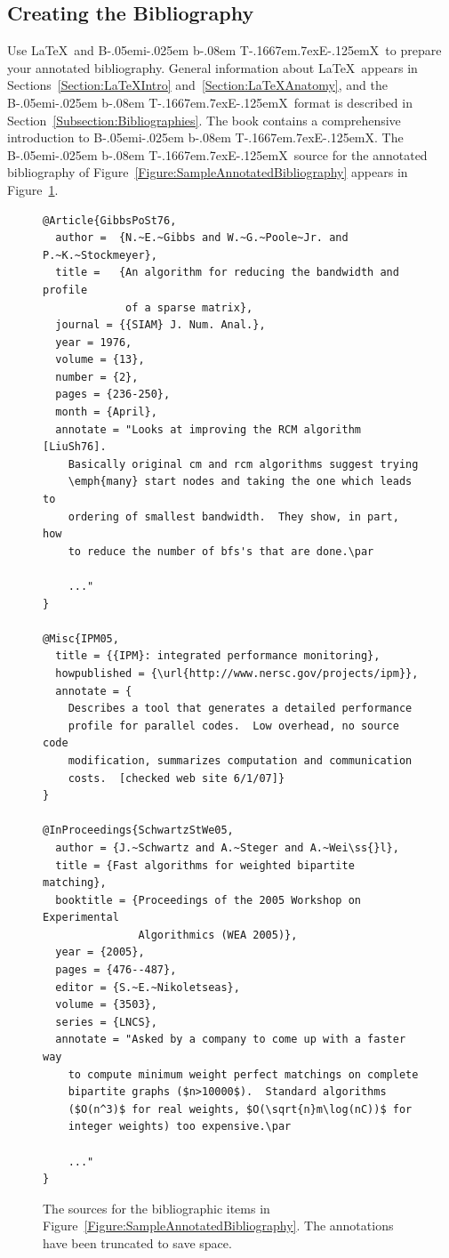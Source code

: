 \documentclass[finalcopy]{srpaper}
\def\hyperref[#1]{}
\let\plainref\ref
\newcommand{\plainref}{\ref*}
\newcommand{\namedref}[2]{\hyperref[#2]{#1~\plainref{#2}}}
\def\BibTeX{{\rm B\kern-.05em{\sc i\kern-.025em b}\kern-.08em
    T\kern-.1667em\lower.7ex\hbox{E}\kern-.125emX}}
\begin{document}
\subsection{Creating the Bibliography}
Use \LaTeX\ and \BibTeX\ to prepare your annotated
bibliography. General information about \LaTeX\ appears in
\namedref{Sections}{Section:LaTeXIntro}
and~\ref{Section:LaTeXAnatomy}, and the \BibTeX\ format
is described in \namedref{Section}{Subsection:Bibliographies}.
The book \cite{Lamport1994} contains a comprehensive
introduction to \BibTeX.
The \BibTeX\ source for the annotated bibliography of
\namedref{Figure}{Figure:SampleAnnotatedBibliography} appears in
\namedref{Figure}{Figure:SampleAnnotatedEntries}.
\begin{figure}
\begin{center}
\begin{minipage}{0.9\textwidth}\fontsize{9}{10}
\begin{verbatim}
@Article{GibbsPoSt76,
  author =  {N.~E.~Gibbs and W.~G.~Poole~Jr. and P.~K.~Stockmeyer},
  title =   {An algorithm for reducing the bandwidth and profile
             of a sparse matrix},
  journal = {{SIAM} J. Num. Anal.},
  year = 1976,
  volume = {13},
  number = {2},
  pages = {236-250},
  month = {April},
  annotate = "Looks at improving the RCM algorithm [LiuSh76].
    Basically original cm and rcm algorithms suggest trying
    \emph{many} start nodes and taking the one which leads to
    ordering of smallest bandwidth.  They show, in part, how
    to reduce the number of bfs's that are done.\par

    ..."
}

@Misc{IPM05,
  title = {{IPM}: integrated performance monitoring},
  howpublished = {\url{http://www.nersc.gov/projects/ipm}},
  annotate = {
    Describes a tool that generates a detailed performance
    profile for parallel codes.  Low overhead, no source code 
    modification, summarizes computation and communication 
    costs.  [checked web site 6/1/07]}
}

@InProceedings{SchwartzStWe05,
  author = {J.~Schwartz and A.~Steger and A.~Wei\ss{}l},
  title = {Fast algorithms for weighted bipartite matching},
  booktitle = {Proceedings of the 2005 Workshop on Experimental
               Algorithmics (WEA 2005)},
  year = {2005},
  pages = {476--487},
  editor = {S.~E.~Nikoletseas},
  volume = {3503},
  series = {LNCS},
  annotate = "Asked by a company to come up with a faster way
    to compute minimum weight perfect matchings on complete
    bipartite graphs ($n>10000$).  Standard algorithms
    ($O(n^3)$ for real weights, $O(\sqrt{n}m\log(nC))$ for
    integer weights) too expensive.\par

    ..."
}
\end{verbatim}
\end{minipage}
\end{center}
\caption[Sample bibliographic entries]{The sources for the
bibliographic items in
\namedref{Figure}{Figure:SampleAnnotatedBibliography}. The
annotations have been truncated to save space.}
\label{Figure:SampleAnnotatedEntries}
\end{figure}
\end{document}
